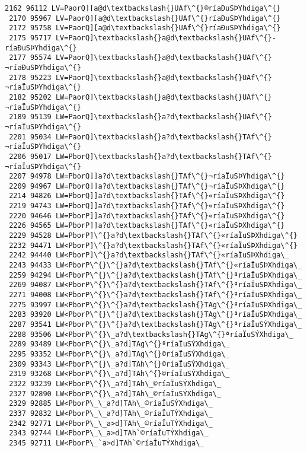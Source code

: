 \documentclass[11pt]{article}
\begin{document}
\begin{Verbatim}[commandchars=\\\{\}]
 2162 96112 LV=PaorQ][a@d\textbackslash{}UAf\^{}®ríaÐuSÞYhdiga\^{}
 2170 95967 LV=PaorQ][a@d\textbackslash{}UAf\^{}­ríaÐuSÞYhdiga\^{}
 2172 95758 LV=PaorQ][a@d\textbackslash{}UAf\^{}­ríaÐuSÞYhdiga\^{}
 2175 95717 LV=PaorQ]\textbackslash{}a@d\textbackslash{}UAf\^{}­ríaÐuSÞYhdiga\^{}
 2177 95574 LV=PaorQ]\textbackslash{}a@d\textbackslash{}UAf\^{}¬ríaÐuSÞYhdiga\^{}
 2178 95223 LV=PaorQ]\textbackslash{}a@d\textbackslash{}UAf\^{}¬ríaÏuSÞYhdiga\^{}
 2182 95202 LW=PaorQ]\textbackslash{}a@d\textbackslash{}UAf\^{}¬ríaÏuSÞYhdiga\^{}
 2189 95139 LW=PaorQ]\textbackslash{}a?d\textbackslash{}UAf\^{}¬ríaÏuSÞYhdiga\^{}
 2201 95034 LW=PaorQ]\textbackslash{}a?d\textbackslash{}TAf\^{}¬ríaÏuSÞYhdiga\^{}
 2206 95017 LW=PborQ]\textbackslash{}a?d\textbackslash{}TAf\^{}¬ríaÏuSÞYhdiga\^{}
 2207 94978 LW=PborQ]]a?d\textbackslash{}TAf\^{}¬ríaÏuSÞYhdiga\^{}
 2209 94967 LW=PborQ]]a?d\textbackslash{}TAf\^{}¬ríaÏuSÞXhdiga\^{}
 2214 94826 LW=PborQ]]a?d\textbackslash{}TAf\^{}«ríaÏuSÞXhdiga\^{}
 2219 94743 LW=PborQ]]a?d\textbackslash{}TAf\^{}«ríaÏuSÞXhdiga\^{}
 2220 94646 LW=PborP]]a?d\textbackslash{}TAf\^{}«ríaÏuSÞXhdiga\^{}
 2226 94565 LW=PborP]]a?d\textbackslash{}TAf\^{}«ríaÏuSÞXhdiga\^{}
 2229 94528 LW=PborP]\^{}a?d\textbackslash{}TAf\^{}«ríaÏuSÞXhdiga\^{}
 2232 94471 LW<PborP]\^{}a?d\textbackslash{}TAf\^{}«ríaÏuSÞXhdiga\^{}
 2242 94440 LW<PborP]\^{}a?d\textbackslash{}TAf\^{}«ríaÏuSÞXhdiga\_
 2243 94433 LW<PborP\^{}\^{}a?d\textbackslash{}TAf\^{}«ríaÏuSÞXhdiga\_
 2259 94294 LW<PborP\^{}\^{}a?d\textbackslash{}TAf\^{}ªríaÏuSÞXhdiga\_
 2269 94087 LW<PborP\^{}\^{}a?d\textbackslash{}TAf\^{}ªríaÏuSÞXhdiga\_
 2271 94008 LW<PborP\^{}\^{}a?d\textbackslash{}TAf\^{}ªríaÏuSÞXhdiga\_
 2275 93997 LW<PborP\^{}\^{}a?d\textbackslash{}TAg\^{}ªríaÏuSÞXhdiga\_
 2283 93920 LW<PborP\^{}\^{}a?d\textbackslash{}TAg\^{}ªríaÏuSÞXhdiga\_
 2287 93541 LW<PborP\^{}\^{}a?d\textbackslash{}TAg\^{}ªríaÏuSÝXhdiga\_
 2288 93506 LW<PborP\^{}\_a?d\textbackslash{}TAg\^{}ªríaÏuSÝXhdiga\_
 2289 93489 LW<PborP\^{}\_a?d]TAg\^{}ªríaÏuSÝXhdiga\_
 2295 93352 LW<PborP\^{}\_a?d]TAg\^{}©ríaÏuSÝXhdiga\_
 2309 93343 LW<PborP\^{}\_a?d]TAh\^{}©ríaÏuSÝXhdiga\_
 2319 93268 LW<PborP\^{}\_a?d]TAh\^{}©ríaÏuSÝXhdiga\_
 2322 93239 LW<PborP\^{}\_a?d]TAh\_©ríaÏuSÝXhdiga\_
 2327 92890 LW<PborP\^{}\_a?d]TAh\_©ríaÎuSÝXhdiga\_
 2329 92885 LW<PborP\_\_a?d]TAh\_©ríaÎuSÝXhdiga\_
 2337 92832 LW<PborP\_\_a?d]TAh\_©ríaÎuTÝXhdiga\_
 2342 92771 LW<PborP\_\_a>d]TAh\_©ríaÎuTÝXhdiga\_
 2343 92744 LW<PborP\_\_a>d]TAh`©ríaÎuTÝXhdiga\_
 2345 92711 LW<PborP\_`a>d]TAh`©ríaÎuTÝXhdiga\_

\end{Verbatim}
\end{document}
